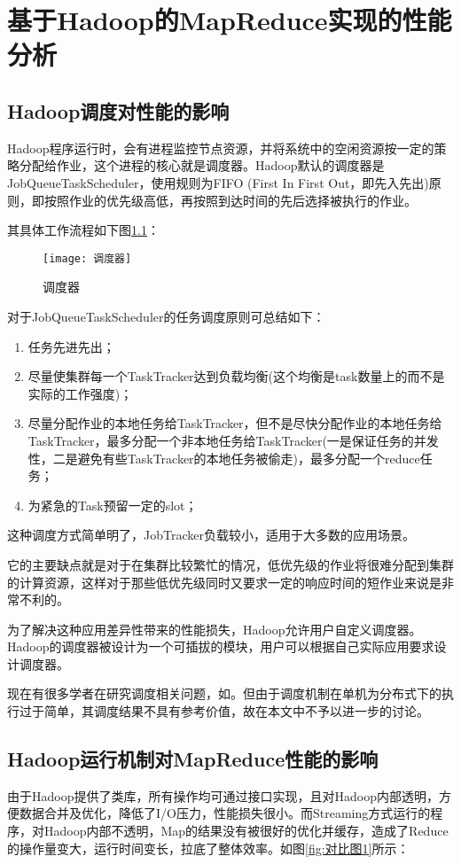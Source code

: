 \chapter{基于Hadoop的MapReduce实现的性能分析}
\label{chap:4}

\section{Hadoop调度对性能的影响}
Hadoop程序运行时，会有进程监控节点资源，并将系统中的空闲资源按一定的策略分配给作业，这个进程的核心就是调度器。Hadoop默认的调度器是JobQueueTaskScheduler，使用规则为FIFO (First In First Out，即先入先出)原则，即按照作业的优先级高低，再按照到达时间的先后选择被执行的作业。

其具体工作流程如下图\ref{fig:调度器}：
\begin{figure}[h]
 \centering
 \texttt{[image: 调度器]}
 \caption{调度器}
 \label{fig:调度器}
\end{figure}

对于JobQueueTaskScheduler的任务调度原则可总结如下：

\begin{enumerate}
\item 任务先进先出；
\item 尽量使集群每一个TaskTracker达到负载均衡(这个均衡是task数量上的而不是实际的工作强度)；
\item 尽量分配作业的本地任务给TaskTracker，但不是尽快分配作业的本地任务给TaskTracker，最多分配一个非本地任务给TaskTracker(一是保证任务的并发性，二是避免有些TaskTracker的本地任务被偷走)，最多分配一个reduce任务；
\item 为紧急的Task预留一定的slot；
\end{enumerate}

这种调度方式简单明了，JobTracker负载较小，适用于大多数的应用场景。

它的主要缺点就是对于在集群比较繁忙的情况，低优先级的作业将很难分配到集群的计算资源，这样对于那些低优先级同时又要求一定的响应时间的短作业来说是非常不利的。

为了解决这种应用差异性带来的性能损失，Hadoop允许用户自定义调度器。Hadoop的调度器被设计为一个可插拔的模块，用户可以根据自己实际应用要求设计调度器。

现在有很多学者在研究调度相关问题，如\cite{paper:A-Dynamic-MapReduce-Scheduler-for-Heterogeneous-Workloads}。但由于调度机制在单机为分布式下的执行过于简单，其调度结果不具有参考价值，故在本文中不予以进一步的讨论。

\section{Hadoop运行机制对MapReduce性能的影响}
由于Hadoop提供了类库，所有操作均可通过接口实现，且对Hadoop内部透明，方便数据合并及优化，降低了I/O压力，性能损失很小。而Streaming方式运行的程序，对Hadoop内部不透明，Map的结果没有被很好的优化并缓存，造成了Reduce的操作量变大，运行时间变长，拉底了整体效率。如图\ref{fig:对比图1}所示：

